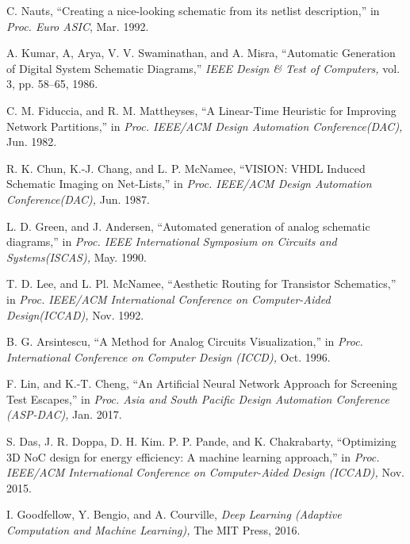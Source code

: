 \documentclass[twocolumn]{article}
\begin{document}
\begin{thebibliography}{99}
\footnotesize
{}
C. Nauts,
``Creating a nice-looking schematic from its netlist description,''
in {\em Proc. Euro ASIC}, Mar. 1992.

A. Kumar, A, Arya, V. V. Swaminathan, and A. Misra,
``Automatic Generation of Digital System Schematic Diagrams,''
{\em IEEE Design \& Test of Computers,}
vol. 3, pp. 58--65, 1986.

C. M. Fiduccia, and R. M. Mattheyses,
``A Linear-Time Heuristic for Improving Network Partitions,''
in {\em Proc. IEEE/ACM Design Automation Conference(DAC),}
Jun. 1982.

R. K. Chun, K.-J. Chang, and L. P. McNamee,
``VISION: VHDL Induced Schematic Imaging on Net-Lists,''
in {\em Proc. IEEE/ACM Design Automation Conference(DAC),}
Jun. 1987.

L. D. Green, and J. Andersen,
``Automated generation of analog schematic diagrams,''
in {\em Proc. IEEE International Symposium on Circuits and Systems(ISCAS),}
May. 1990.

T. D. Lee, and L. Pl. McNamee,
``Aesthetic Routing for Transistor Schematics,''
in {\em Proc. IEEE/ACM International Conference
 on Computer-Aided Design(ICCAD),}
Nov. 1992.

B. G. Arsintescu,
``A Method for Analog Circuits Visualization,''
in {\em Proc. International Conference on Computer Design (ICCD),}
Oct. 1996.

F. Lin, and K.-T. Cheng,
``An Artificial Neural Network Approach for Screening Test Escapes,''
in {\em Proc. Asia and South Pacific Design Automation Conference (ASP-DAC),}
Jan. 2017.

S. Das, J. R. Doppa, D. H. Kim. P. P. Pande, and K. Chakrabarty,
``Optimizing 3D NoC design for energy efficiency:
 A machine learning approach,''
in {\em Proc. IEEE/ACM International Conference on
 Computer-Aided Design (ICCAD),}
Nov. 2015.

I. Goodfellow, Y. Bengio, and A. Courville,
{\em Deep Learning (Adaptive Computation and Machine Learning),}
The MIT Press, 2016. 

\end{thebibliography}
\end{document}
